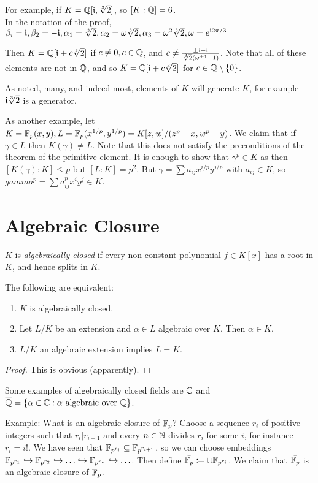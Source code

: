 \documentclass[10pt,a4paper]{article}
\begin{document}
For example, if $K = \mathbb{Q}[\mathfrak{i}, \sqrt[3]{2}]$, so $[K:\mathbb{Q}] = 6$.\\
In the notation of the proof, $\beta_i = \mathfrak{i}, \beta_2 = - \mathfrak{i}, \alpha_1 = \sqrt[3]{2}, \alpha_2 = \omega \sqrt[3]{2}, \alpha_3= \omega^2\sqrt[3]{2}, \omega=e^{\mathfrak{i}2\pi/3}$

Then $K=\mathbb{Q}[\mathfrak{i}+c\sqrt[3]{2}]$ if $c\neq 0, c \in \mathbb{Q}$, and $c \neq \frac{\pm\mathfrak{i}-\mathfrak{i}}{\sqrt[3]{2}(\omega^{\pm 1}-1)}$. Note that all of these elements are not in $\mathbb{Q}$, and so $K = \mathbb{Q}[\mathfrak{i}+c\sqrt[3]{2}]$ for $c\in \mathbb{Q}\setminus\{0\}$.

As noted, many, and indeed most, elements of $K$ will generate $K$, for example $\mathfrak{i}\sqrt[3]{2}$ is a generator.

As another example, let $K = \mathbb{F}_p(x,y), L = \mathbb{F}_p(x^{1/p}, y^{1/p}) = K[z,w]/(z^p-x, w^p-y)$. We claim that if $\gamma \in L$ then $K(\gamma) \neq L$. Note that this does not satisfy the preconditions of the theorem of the primitive element. It is enough to show that $\gamma^p \in K$ as then $[K(\gamma):K] \leq p$ but $[L:K] = p^2$. But $\gamma = \sum a_{ij}x^{i/p}y^{j/p}$ with $a_{ij} \in K$, so $gamma^p =\sum a_{ij}^p x^i y^j \in K$.

\section{Algebraic Closure}
$K$ is \emph{algebraically closed} if every non-constant polynomial $f \in K[x]$ has a root in $K$, and hence splits in $K$. 
\begin{lemma}
The following are equivalent:
\begin{enumerate}
\item $K$ is algebraically closed.
\item Let $L/K$ be an extension and $\alpha \in L$ algebraic over $K$. Then $\alpha \in K$.
\item $L/K$ an algebraic extension implies $L=K$.
\end{enumerate}
\end{lemma}
\begin{proof}
This is obvious (apparently).
\end{proof}
Some examples of algebraically closed fields are $\mathbb{C}$ and $\overline{\mathbb{Q}} = \{\alpha \in \mathbb{C} : \alpha \text{ algebraic over } \mathbb{Q}\}$.

\underline{Example:} What is an algebraic closure of $\mathbb{F}_p$? Choose a sequence $r_i$ of positive integers such that $r_i | r_{i+1}$ and every $n \in \mathbb{N}$ divides $r_i$ for some $i$, for instance $r_i = i!$. We have seen that $\mathbb{F}_{p^{r_i}} \subseteq \mathbb{F}_{p^{r_{i+1}}}$, so we can choose embeddings $\mathbb{F}_{p^{r_1}} \hookrightarrow \mathbb{F}_{p^{r_2}} \hookrightarrow \ldots \hookrightarrow \mathbb{F}_{p^{r_n}} \hookrightarrow \ldots$. Then define $\bar{\mathbb{F}_p}\coloneqq \cup \mathbb{F}_{p^{r_i}}$. We claim that $\bar{\mathbb{F}_p}$ is an algebraic closure of $\mathbb{F}_p$.
\end{document}
